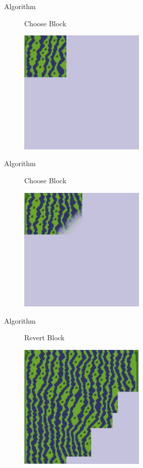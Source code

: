 \documentclass{beamer}
\begin{document}
  \begin{frame}[fragile]{Algorithm}
    \begin{figure}
      Choose Block

      \includegraphics[width=6cm]{img/fm_0005.pdf}
    \end{figure}
  \end{frame}

  \begin{frame}[fragile]{Algorithm}
    \begin{figure}
      Choose Block

      \includegraphics[width=6cm]{img/fm_0006.pdf}
    \end{figure}
  \end{frame}

  \begin{frame}[fragile]{Algorithm}
    \begin{figure}
      Revert Block

      \includegraphics[width=6cm]{img/fm_0023.pdf}
    \end{figure}
  \end{frame}
\end{document}
